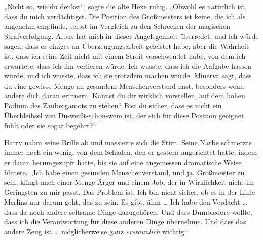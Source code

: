 „Nicht so, wie du denkst“, sagte die alte Hexe ruhig.
„Obwohl es natürlich ist, dass du mich verdächtigst. Die Position des Großmeisters ist keine, die ich als angenehm empfinde, selbst im Vergleich zu den Schrecken der magischen Strafverfolgung. Albus hat mich in dieser Angelegenheit überredet, und ich würde sagen, dass er einiges an Überzeugungsarbeit geleistet habe, aber die Wahrheit ist, dass ich seine Zeit nicht mit einem Streit verschwendet habe, von dem ich erwartete, dass ich ihn verlieren würde. Ich wusste, dass ich die Aufgabe hassen würde, und ich wusste, dass ich sie trotzdem machen würde. Minerva sagt, dass du eine gewisse Menge an gesundem Menschenverstand hast, besonders wenn andere dich daran erinnern. Kannst du dir wirklich vorstellen, auf dem hohen Podium des Zaubergamots zu stehen? Bist du sicher, dass es nicht ein Überbleibsel von Du-weißt-schon-wem ist, der sich für diese Position geeignet fühlt oder sie sogar begehrt?“

Harry nahm seine Brille ab und massierte sich die Stirn. Seine Narbe schmerzte immer noch ein wenig, von dem Schaden, den er gestern angerichtet hatte, indem er daran herumgezupft hatte, bis sie auf eine angemessen dramatische Weise blutete.
„Ich habe einen gesunden Menschenverstand, und ja, Großmeister zu sein, klingt nach einer Menge Ärger und einem Job, der in Wirklichkeit nicht im Geringsten zu mir passt. Das Problem ist. Ich bin nicht sicher, ob es in der Linie Merlins nur darum geht, das zu sein. Es gibt, ähm … Ich habe den Verdacht … dass da noch andere seltsame Dinge dazugehören. Und dass Dumbledore wollte, dass ich die Verantwortung für diese anderen Dinge übernehme. Und dass das andere Zeug ist … möglicherweise ganz \emph{erstaunlich} wichtig.“

